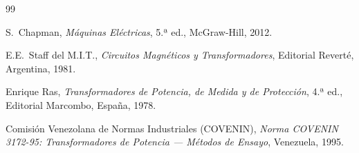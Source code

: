 \documentclass[12pt,a4paper]{article}
\begin{document}


\tableofcontents
\newpage






\clearpage
\begin{thebibliography}{99}

S.~Chapman, \textit{Máquinas Eléctricas}, 5.ª ed., McGraw-Hill, 2012.

E.E.~Staff del M.I.T., \textit{Circuitos Magnéticos y Transformadores}, Editorial Reverté, Argentina, 1981.

Enrique Ras, \textit{Transformadores de Potencia, de Medida y de Protección}, 4.ª ed., Editorial Marcombo, España, 1978.

Comisión Venezolana de Normas Industriales (COVENIN), \textit{Norma COVENIN 3172-95: Transformadores de Potencia — Métodos de Ensayo}, Venezuela, 1995.

\end{thebibliography}
\end{document}
